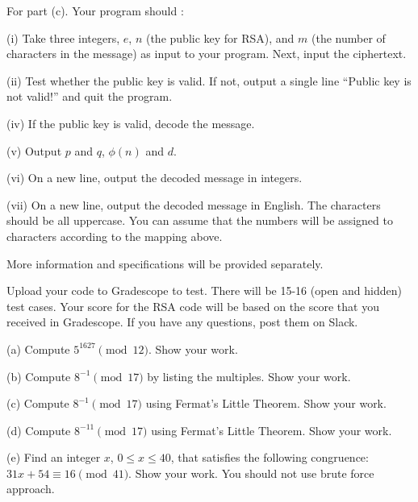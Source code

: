 \documentclass{article}
\begin{document}
\begin{problem}
\begin{description}
\end{description}

\vspace{0.2in}
\noindent For part (c). Your program should :
\begin{description}

	\item (i) Take three integers, $e$, $n$ (the public key for RSA), and $m$ (the number of characters in the message) as input to your program. Next, input the ciphertext.
	\item (ii) Test whether the public key is valid. If not, output a single line ``Public key is not valid!'' and quit the program.
	\item (iv) If the public key is valid, decode the message.
	\item (v) Output $p$ and $q$, $\phi(n)$ and $d$.
	\item (vi) On a new line, output the decoded message in integers.
	\item (vii) On a new line, output the decoded message in English. The characters should be all uppercase. You can assume that the numbers will be assigned to characters according to the mapping above.
 
\end{description}

\noindent More information and specifications will be provided separately.

\vspace{0.2in}
\noindent Upload your code to Gradescope to test. There will be 15-16 (open and hidden) test cases.  Your score for the RSA code will be based on the score that you received in Gradescope. If you have any questions, post them on Slack.


\end{problem}
\vspace{0.2in}



\begin{problem}

\medskip\noindent
(a) Compute $5^{1627}\pmod{12}$. Show your work.

\medskip\noindent
(b) Compute $8^{-1}\pmod{17}$ by listing the multiples. Show your work.

\medskip\noindent
(c) Compute $8^{-1}\pmod{17}$ using Fermat's Little Theorem. Show your work.

\medskip\noindent
(d) Compute $8^{-11}\pmod{17}$ using Fermat's Little Theorem. Show your work.

\medskip\noindent
(e) Find an integer $x$, $0\le x \le 40$, that satisfies the following congruence:
$31x + 54 \equiv 16 \pmod{41}$. Show your work. You should not use brute force approach.


\end{problem}
\end{document}
